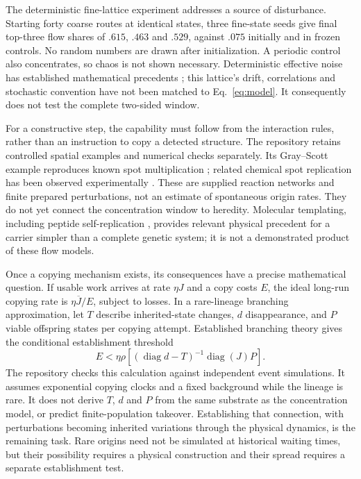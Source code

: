 The deterministic fine-lattice experiment addresses a source of disturbance.
Starting forty coarse routes at identical states, three fine-state seeds give
final top-three flow shares of $.615$, $.463$ and $.529$, against $.075$ initially
and in frozen controls. No random numbers are drawn after initialization.
A periodic control also concentrates, so chaos is not shown necessary.
Deterministic effective noise has established mathematical precedents
\cite{melbourne,gottwald}; this lattice's drift, correlations and stochastic
convention have not been matched to Eq.~\eqref{eq:model}. It consequently does
not test the complete two-sided window.

For a constructive step, the capability must follow from the interaction rules,
rather than an instruction to copy a detected structure. The repository retains
controlled spatial examples and numerical checks separately. Its Gray--Scott
example reproduces known spot multiplication \cite{pearson,spots}; related
chemical spot replication has been observed experimentally \cite{chemicalspots}.
These are supplied reaction networks and finite prepared perturbations, not an
estimate of spontaneous origin rates. They do not yet connect the concentration
window to heredity. Molecular templating, including peptide self-replication
\cite{peptide}, provides relevant physical precedent for a carrier simpler than
a complete genetic system; it is not a demonstrated product of these flow models.

Once a copying mechanism exists, its consequences have a precise mathematical
question. If usable work arrives at rate $\eta J$ and a copy costs $E$, the ideal
long-run copying rate is $\eta\overline J/E$, subject to losses. In a rare-lineage
branching approximation, let $T$ describe inherited-state changes, $d$ disappearance,
and $P$ viable offspring states per copying attempt. Established branching theory
\cite{branching} gives the conditional establishment threshold
\begin{equation}
 E<\eta\rho\!\left[(\operatorname{diag}d-T)^{-1}\operatorname{diag}(J)P\right].
\end{equation}
The repository checks this calculation against independent event simulations.
It assumes exponential copying clocks and a fixed background while the lineage
is rare. It does not derive $T$, $d$ and $P$ from the same substrate as the
concentration model, or predict finite-population takeover. Establishing that
connection, with perturbations becoming inherited variations through the
physical dynamics, is the remaining task. Rare origins need not be simulated
at historical waiting times, but their possibility requires a physical
construction and their spread requires a separate establishment test.
